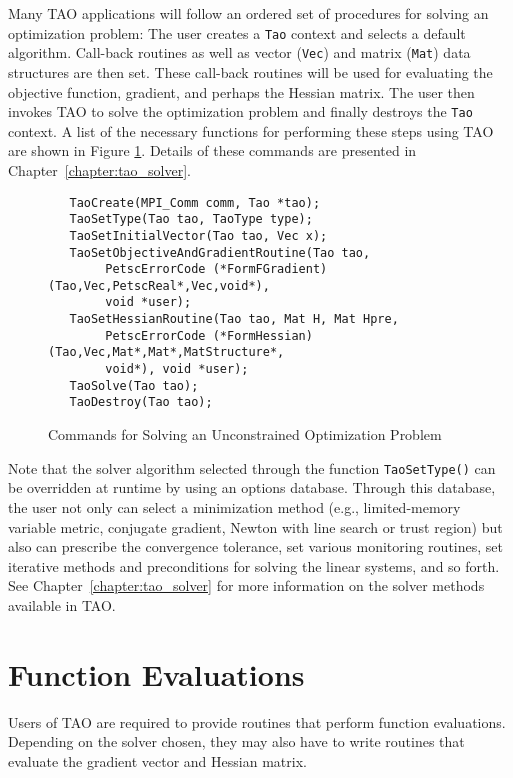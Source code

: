 Many TAO applications will follow an ordered set of procedures for 
solving an optimization problem:
The user creates a \texttt{Tao} context and selects a default algorithm. 
Call-back routines as well as vector (\texttt{Vec}) and matrix (\texttt{Mat}) 
data structures are then set.  These call-back routines will be used for 
evaluating the objective function, gradient, and perhaps the Hessian 
matrix.  The user then invokes TAO to solve the optimization problem and 
finally destroys
the \texttt{Tao} context. A list of the necessary functions for 
performing these steps
using TAO are shown in Figure \ref{fig:tao_commands}.  Details of these commands are presented in
Chapter~\ref{chapter:tao_solver}.

 
 
 
\begin{figure}[H]
\begin{verbatim}
   TaoCreate(MPI_Comm comm, Tao *tao); 
   TaoSetType(Tao tao, TaoType type);
   TaoSetInitialVector(Tao tao, Vec x);
   TaoSetObjectiveAndGradientRoutine(Tao tao, 
        PetscErrorCode (*FormFGradient)(Tao,Vec,PetscReal*,Vec,void*), 
        void *user);
   TaoSetHessianRoutine(Tao tao, Mat H, Mat Hpre,
        PetscErrorCode (*FormHessian)(Tao,Vec,Mat*,Mat*,MatStructure*,
        void*), void *user);
   TaoSolve(Tao tao);
   TaoDestroy(Tao tao);
\end{verbatim}
\caption{Commands for Solving an Unconstrained Optimization Problem
\label{fig:tao_commands}}
\end{figure}

Note that the solver algorithm selected through the function 
\texttt{TaoSetType()} can be overridden
at runtime by using an options database.  Through this
database, the user not only can select a minimization method (e.g.,
limited-memory variable metric, conjugate gradient, Newton with line
search or trust region) but also can prescribe the convergence
tolerance, set various monitoring routines, set iterative methods
and preconditions for solving the linear systems, and so forth.  See 
Chapter~\ref{chapter:tao_solver} for more information on the 
solver methods available in TAO.

\section{Function Evaluations}

Users of TAO are required to provide routines that perform function
evaluations. Depending on the solver chosen, they may also have to
write routines that evaluate the gradient vector and Hessian matrix.

